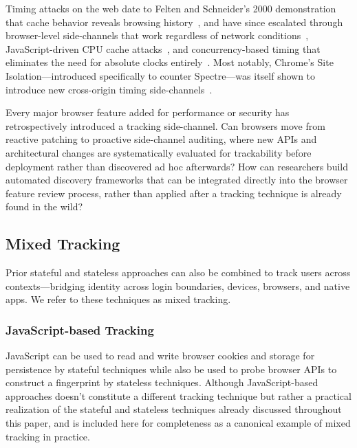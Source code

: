 %
Timing attacks on the web date to Felten and Schneider's 2000 demonstration that cache behavior reveals browsing
history~\cite{feltenTimingAttacksWeb2000}, and have since escalated through browser-level side-channels that work regardless of network conditions~\cite{van2015clock}, 
JavaScript-driven CPU cache attacks~\cite{orenSpySandboxPractical2015}, and concurrency-based timing that eliminates the need for absolute clocks entirely~\cite{van2020timeless}. 
%
Most notably, Chrome's Site Isolation---introduced specifically to counter Spectre---was itself shown to introduce new cross-origin timing side-channels~\cite{jinTimingBasedBrowsingPrivacy2022}.


\begin{opbox}
Every major browser feature added for performance or security has
retrospectively introduced a tracking side-channel. Can browsers move
from reactive patching to proactive side-channel auditing, where new
APIs and architectural changes are systematically evaluated for
trackability before deployment rather than discovered ad hoc afterwards? How can researchers build automated discovery frameworks that can be integrated directly into the browser feature review process, rather than applied after a tracking technique is already found in the wild?
\end{opbox}


\subsection{Mixed Tracking}
\label{sec:mixed-techniques}

Prior stateful and stateless approaches can also be combined to track users across contexts---bridging identity across login boundaries, devices, browsers, and native apps. We refer to these techniques as mixed tracking.

\subsubsection{JavaScript-based Tracking}
\label{sec:mixed-techniques-js-tracking}

%
JavaScript can be used to read and write browser cookies and storage for persistence by stateful techniques while also be used to probe browser APIs to construct a fingerprint by stateless techniques.
%
Although JavaScript-based approaches doesn't constitute a different tracking technique but rather a practical realization of the stateful and stateless techniques already discussed throughout this paper, and is included here for completeness as a canonical example of mixed tracking in practice.


